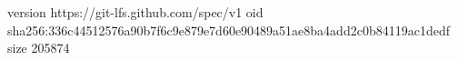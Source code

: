 version https://git-lfs.github.com/spec/v1
oid sha256:336c44512576a90b7f6c9e879e7d60e90489a51ae8ba4add2c0b84119ac1dedf
size 205874
